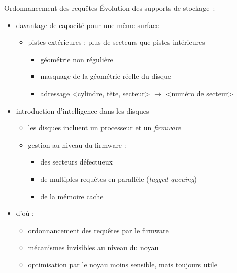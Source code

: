 \begin {frame} {Ordonnancement des requêtes}
    Évolution des supports de stockage~:

    \begin {itemize}
	\item davantage de capacité pour une même surface
	    \begin {itemize}
		\item pistes extérieures : plus
		    de secteurs que pistes intérieures
		    \begin {itemize}
			\item géométrie non régulière
			\item masquage de la géométrie réelle du disque
			\item adressage <cylindre, tête, secteur>
			    $\rightarrow$ <numéro de secteur>
		    \end {itemize}
	    \end {itemize}
	\item introduction d'intelligence dans les disques
	    \begin {itemize}
		\item les disques incluent un processeur et un \textit
		    {firmware}
		\item gestion au niveau du firmware :
		    \begin {itemize}
			\item des secteurs défectueux
			\item de multiples requêtes en parallèle
			    (\textit {tagged queuing})
			\item de la mémoire cache
		    \end {itemize}
	    \end {itemize}
	\item d'où :
	    \begin {itemize}
		\item ordonnancement des requêtes par le firmware
		\item mécanismes invisibles au niveau du noyau
		\item optimisation par le noyau moins sensible,
		    mais toujours utile
	    \end {itemize}
	\end {itemize}
\end {frame}

